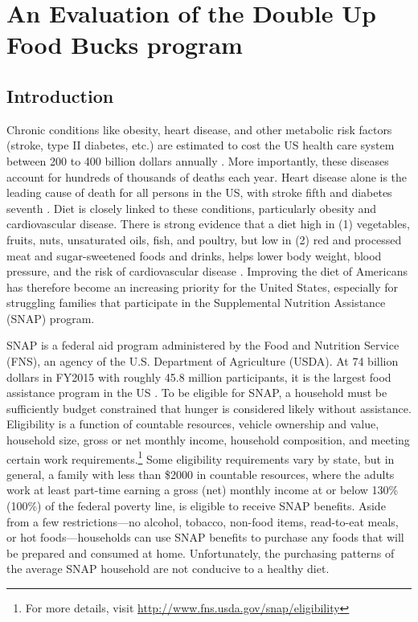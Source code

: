 \documentclass[12pt,letterpaperpaper,]{book}
\begin{document}
\chapter{An Evaluation of the Double Up Food Bucks
program}\label{chapter-1}

\section*{Introduction}\label{intro-1}

Chronic conditions like obesity, heart disease, and other metabolic risk
factors (stroke, type II diabetes, etc.) are estimated to cost the US
health care system between 200 to 400 billion dollars annually
\citep{cawley_medical_2012, chatterjee_checkup_2014}. More importantly,
these diseases account for hundreds of thousands of deaths each year.
Heart disease alone is the leading cause of death for all persons in the
US, with stroke fifth and diabetes seventh
\citep{national_center_for_health_statistics_health_2015}. Diet is
closely linked to these conditions, particularly obesity and
cardiovascular disease. There is strong evidence that a diet high in (1)
vegetables, fruits, nuts, unsaturated oils, fish, and poultry, but low
in (2) red and processed meat and sugar-sweetened foods and drinks,
helps lower body weight, blood pressure, and the risk of cardiovascular
disease
\citep{mente_systematic_2009, nutrition_evidence_library_series_2014}.
Improving the diet of Americans has therefore become an increasing
priority for the United States, especially for struggling families that
participate in the Supplemental Nutrition Assistance (SNAP) program.

SNAP is a federal aid program administered by the Food and Nutrition
Service (FNS), an agency of the U.S. Department of Agriculture (USDA).
At 74 billion dollars in FY2015 with roughly 45.8 million participants,
it is the largest food assistance program in the US
\citep{usda_fns_supplemental_2016}. To be eligible for SNAP, a household
must be sufficiently budget constrained that hunger is considered likely
without assistance. Eligibility is a function of countable resources,
vehicle ownership and value, household size, gross or net monthly
income, household composition, and meeting certain work
requirements.\footnote{For more details, visit
  \url{http://www.fns.usda.gov/snap/eligibility}} Some eligibility
requirements vary by state, but in general, a family with less than
\$2000 in countable resources, where the adults work at least part-time
earning a gross (net) monthly income at or below 130\% (100\%) of the
federal poverty line, is eligible to receive SNAP benefits. Aside from a
few restrictions---no alcohol, tobacco, non-food items, read-to-eat
meals, or hot foods---households can use SNAP benefits to purchase any
foods that will be prepared and consumed at home. Unfortunately, the
purchasing patterns of the average SNAP household are not conducive to a
healthy diet.
\end{document}
